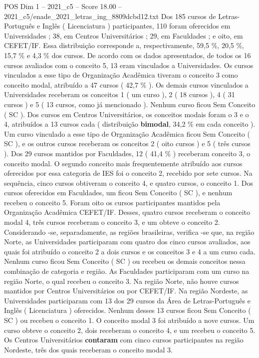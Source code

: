 \begin{textsample}{POS Dim 1 – 2021\_c5 – Score 18.00 – 2021\_c5/enade\_2021\_letras\_ing\_8809dcbd12.txt}
Dos 185 cursos de Letras-Português e Inglês ( Licenciatura ) participantes, 110 foram oferecidos em Universidades ; 38, em Centros Universitários ; 29, em Faculdades ; e oito, em CEFET/IF.
Essa distribuição corresponde a, respectivamente, 59,5 \%, 20,5 \%, 15,7 \% e 4,3 \% dos cursos.
De acordo com os dados apresentados, de todos os 16 cursos avaliados com o conceito 5, 13 eram vinculados a Universidades.
Os cursos vinculados a esse tipo de Organização Acadêmica tiveram o conceito 3 como conceito modal, atribuído a 47 cursos ( 42,7 \% ).
Os demais cursos vinculados a Universidades receberam os conceitos 1 ( um curso ), 2 ( 18 cursos ), 4 ( 31 cursos ) e 5 ( 13 cursos, como já mencionado ).
Nenhum curso ficou Sem Conceito ( SC ).
Dos cursos em Centros Universitários, os conceitos modais foram o 3 e o 4, atribuídos a 13 cursos cada ( distribuição \textbf{bimodal}, 34,2 \% em cada conceito ).
Um curso vinculado a esse tipo de Organização Acadêmica ficou Sem Conceito ( SC ), e os outros cursos receberam os conceitos 2 ( oito cursos ) e 5 ( três cursos ).
Dos 29 cursos mantidos por Faculdades, 12 ( 41,4 \% ) receberam conceito 3, o conceito modal.
O segundo conceito mais frequentemente atribuído aos cursos oferecidos por essa categoria de IES foi o conceito 2, recebido por sete cursos.
Na sequência, cinco cursos obtiveram o conceito 4, e quatro cursos, o conceito 1.
Dos cursos oferecidos em Faculdades, um ficou Sem Conceito ( SC ), e nenhum recebeu o conceito 5.
Foram oito os cursos participantes mantidos pela Organização Acadêmica CEFET/IF.
Desses, quatro cursos receberam o conceito modal 4, três cursos receberam o conceito 3, e um obteve o conceito 2.
Considerando -se, separadamente, as regiões brasileiras, verifica -se que, na região Norte, as Universidades participaram com quatro dos cinco cursos avaliados, aos quais foi atribuído o conceito 2 a dois cursos e os conceitos 3 e 4 a um curso cada.
Nenhum curso ficou Sem Conceito ( SC ) ou recebeu os demais conceitos nessa combinação de categoria e região.
As Faculdades participaram com um curso na região Norte, o qual recebeu o conceito 3.
Na região Norte, não houve cursos mantidos por Centros Universitários ou por CEFET/IF.
Na região Nordeste, as Universidades participaram com 13 dos 29 cursos da Área de Letras-Português e Inglês ( Licenciatura ) oferecidos.
Nenhum desses 13 cursos ficou Sem Conceito ( SC ) ou recebeu o conceito 1.
O conceito modal 3 foi atribuído a nove cursos.
Um curso obteve o conceito 2, dois receberam o conceito 4, e um recebeu o conceito 5.
Os Centros Universitários \textbf{contaram} com cinco cursos participantes na região Nordeste, três dos quais receberam o conceito modal 3.

\end{textsample}
